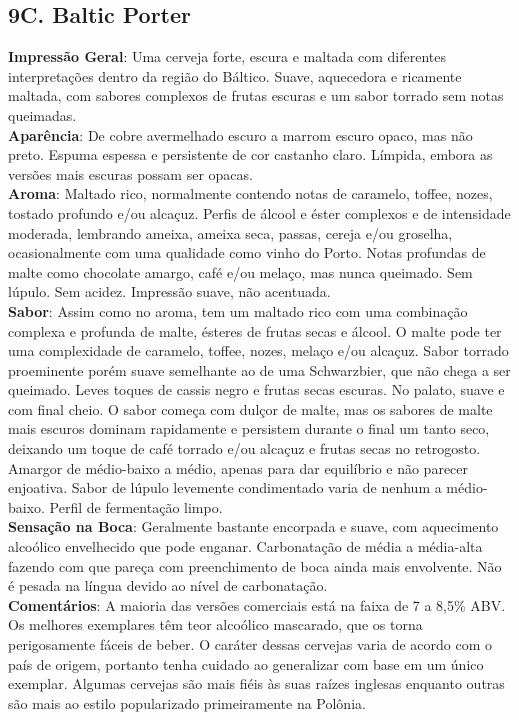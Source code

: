 \subsection*{9C. Baltic Porter}
\textbf{Impressão Geral}: Uma cerveja forte, escura e maltada com diferentes interpretações dentro da região do Báltico. Suave, aquecedora e ricamente maltada, com sabores complexos de frutas escuras e um sabor torrado sem notas queimadas. \\
\textbf{Aparência}: De cobre avermelhado escuro a marrom escuro opaco, mas não preto. Espuma espessa e persistente de cor castanho claro. Límpida, embora as versões mais escuras possam ser opacas. \\
\textbf{Aroma}: Maltado rico, normalmente contendo notas de caramelo, toffee, nozes, tostado profundo e/ou alcaçuz. Perfis de álcool e éster complexos e de intensidade moderada, lembrando ameixa, ameixa seca, passas, cereja e/ou groselha, ocasionalmente com uma qualidade como vinho do Porto. Notas profundas de malte como chocolate amargo, café e/ou melaço, mas nunca queimado. Sem lúpulo. Sem acidez. Impressão suave, não acentuada. \\
\textbf{Sabor}: Assim como no aroma, tem um maltado rico com uma combinação complexa e profunda de malte, ésteres de frutas secas e álcool. O malte pode ter uma complexidade de caramelo, toffee, nozes, melaço e/ou alcaçuz. Sabor torrado proeminente porém suave semelhante ao de uma Schwarzbier, que não chega a ser queimado. Leves toques de cassis negro e frutas secas escuras. No palato, suave e com final cheio. O sabor começa com dulçor de malte, mas os sabores de malte mais escuros dominam rapidamente e persistem durante o final um tanto seco, deixando um toque de café torrado e/ou alcaçuz e frutas secas no retrogosto. Amargor de médio-baixo a médio, apenas para dar equilíbrio e não parecer enjoativa. Sabor de lúpulo levemente condimentado varia de nenhum a médio-baixo. Perfil de fermentação limpo. \\
\textbf{Sensação na Boca}: Geralmente bastante encorpada e suave, com aquecimento alcoólico envelhecido que pode enganar. Carbonatação de média a média-alta fazendo com que pareça com preenchimento de boca ainda mais envolvente. Não é pesada na língua devido ao nível de carbonatação. \\
\textbf{Comentários}: A maioria das versões comerciais está na faixa de 7 a 8,5\% ABV. Os melhores exemplares têm teor alcoólico mascarado, que os torna perigosamente fáceis de beber. O caráter dessas cervejas varia de acordo com o país de origem, portanto tenha cuidado ao generalizar com base em um único exemplar. Algumas cervejas são mais fiéis às suas raízes inglesas enquanto outras são mais ao estilo popularizado primeiramente na Polônia. \\
